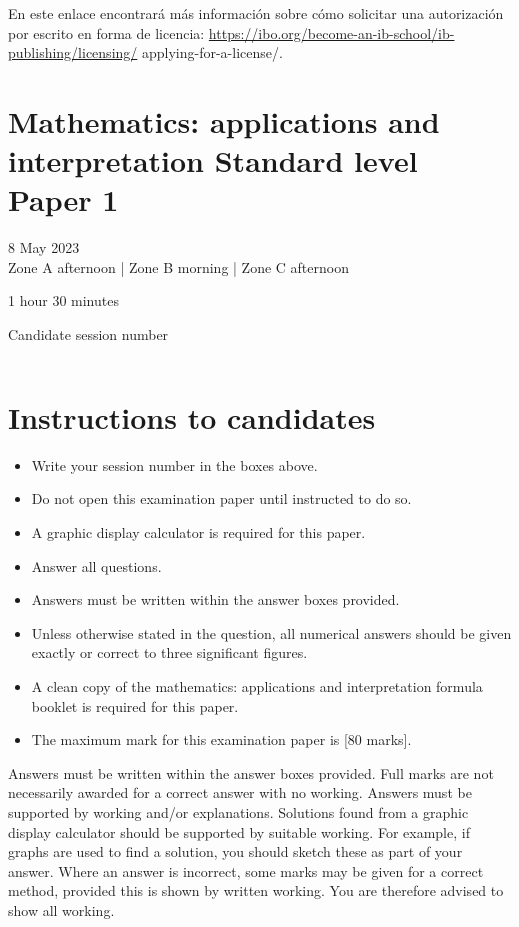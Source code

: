 \documentclass[10pt]{article}
\begin{document}
En este enlace encontrará más información sobre cómo solicitar una autorización por escrito en forma de licencia: \href{https://ibo.org/become-an-ib-school/ib-publishing/licensing/}{https://ibo.org/become-an-ib-school/ib-publishing/licensing/} applying-for-a-license/.

\section*{Mathematics: applications and interpretation Standard level \\
 Paper 1}
8 May 2023\\
Zone A afternoon | Zone B morning | Zone C afternoon

1 hour 30 minutes

Candidate session number

\begin{center}
\begin{tabular}{|l|l|l|l|l|l|l|l|l|l|}
\hline
 &  &  &  &  &  &  &  &  &  \\
\hline
\end{tabular}
\end{center}

\section*{Instructions to candidates}
\begin{itemize}
  \item Write your session number in the boxes above.
  \item Do not open this examination paper until instructed to do so.
  \item A graphic display calculator is required for this paper.
  \item Answer all questions.
  \item Answers must be written within the answer boxes provided.
  \item Unless otherwise stated in the question, all numerical answers should be given exactly or correct to three significant figures.
  \item A clean copy of the mathematics: applications and interpretation formula booklet is required for this paper.
  \item The maximum mark for this examination paper is [80 marks].
\end{itemize}

Answers must be written within the answer boxes provided. Full marks are not necessarily awarded for a correct answer with no working. Answers must be supported by working and/or explanations. Solutions found from a graphic display calculator should be supported by suitable working. For example, if graphs are used to find a solution, you should sketch these as part of your answer. Where an answer is incorrect, some marks may be given for a correct method, provided this is shown by written working. You are therefore advised to show all working.
\end{document}
